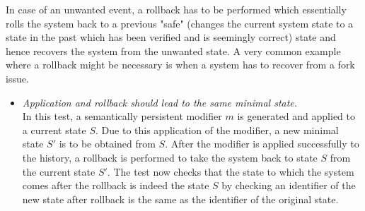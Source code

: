\begin{enumerate}[\IEEEsetlabelwidth{Z}]
In case of an unwanted event, a rollback has to be performed which essentially rolls the system back to a previous "safe" (changes the current system state to a state in the past which has been verified and is seemingly correct) state and hence recovers the system from the unwanted state. A very common example where a rollback might be necessary is when a system has to recover from a fork issue.

\begin{itemize}[]

\item \textit{Application and rollback should lead to the same minimal state.}\\
In this test, a semantically persistent modifier $m$ is generated and applied to a current state $S$. Due to this application of the modifier, a new minimal state $S'$ is to be obtained from $S$. After the modifier is applied successfully to the history, a rollback is performed to take the system back to state $S$ from the current state $S'$. The test now checks that the state to which the system comes after the rollback is indeed the state $S$ by checking an identifier of the new state after rollback is the same as the identifier of the original state.\\


\end{itemize}
\end{enumerate}
